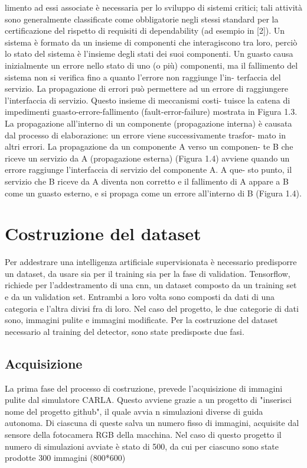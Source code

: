 \documentclass[14pt]{extarticle}
\begin{document}
limento ad essi associate è necessaria per lo sviluppo di sistemi critici; tali
attività sono generalmente classificate come obbligatorie negli stessi standard
per la certificazione del rispetto di requisiti di dependability (ad esempio in
[2]).
Un sistema è formato da un insieme di componenti che interagiscono tra
loro, perciò lo stato del sistema è l’insieme degli stati dei suoi componenti. Un guasto causa inizialmente un errore nello stato di uno (o più) componenti, ma
il fallimento del sistema non si verifica fino a quanto l’errore non raggiunge l’in-
terfaccia del servizio. La propagazione di errori può permettere ad un errore
di raggiungere l’interfaccia di servizio. Questo insieme di meccanismi costi-
tuisce la catena di impedimenti guasto-errore-fallimento (fault-error-failure)
mostrata in Figura 1.3.
La propagazione all’interno di un componente (propagazione interna) è
causata dal processo di elaborazione: un errore viene successivamente trasfor-
mato in altri errori. La propagazione da un componente A verso un componen-
te B che riceve un servizio da A (propagazione esterna) (Figura 1.4) avviene
quando un errore raggiunge l’interfaccia di servizio del componente A. A que-
sto punto, il servizio che B riceve da A diventa non corretto e il fallimento di
A appare a B come un guasto esterno, e si propaga come un errore all’interno
di B (Figura 1.4).
\section{Costruzione del dataset}
Per addestrare una intelligenza artificiale supervisionata è necessario predisporre un dataset, da usare sia per il training sia per la fase di validation.
Tensorflow, richiede per l'addestramento di una cnn, un dataset composto da un training set e da un validation set. Entrambi a loro volta sono composti da dati di una categoria e l'altra divisi fra di loro. Nel caso del progetto, le due categorie di dati sono, immagini pulite e immagini modificate.
Per la costruzione del dataset necessario al training del detector, sono state predisposte due fasi.
\subsection{Acquisizione}
La prima fase del processo di costruzione, prevede l'acquisizione di immagini pulite dal simulatore CARLA. Questo avviene grazie a un progetto di "inserisci nome del progetto github", il quale avvia n simulazioni diverse di guida autonoma. Di ciascuna di queste salva un numero fisso di immagini, acquisite dal sensore della fotocamera RGB della macchina.
Nel caso di questo progetto il numero di simulazioni avviate è stato di 500, da cui per ciascuno sono state prodotte 300 immagini (800*600)
\end{document}
